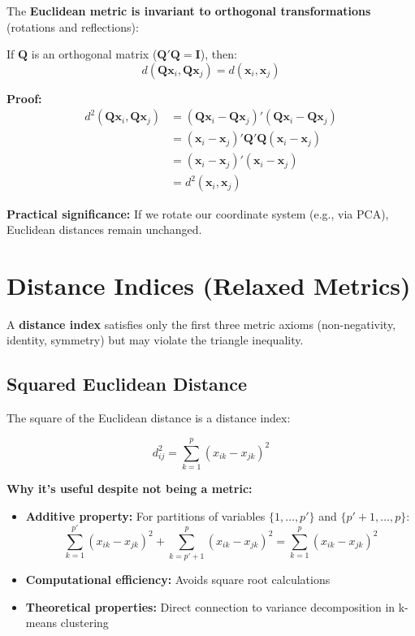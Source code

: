 \documentclass[11pt]{article}
\begin{document}
The \textbf{Euclidean metric is invariant to orthogonal transformations} (rotations and reflections):

If $\mathbf{Q}$ is an orthogonal matrix ($\mathbf{Q}'\mathbf{Q} = \mathbf{I}$), then:
$$d(\mathbf{Q}\mathbf{x}_i, \mathbf{Q}\mathbf{x}_j) = d(\mathbf{x}_i, \mathbf{x}_j)$$

\textbf{Proof:}
\begin{align*}
d^2(\mathbf{Q}\mathbf{x}_i, \mathbf{Q}\mathbf{x}_j) &= (\mathbf{Q}\mathbf{x}_i - \mathbf{Q}\mathbf{x}_j)'(\mathbf{Q}\mathbf{x}_i - \mathbf{Q}\mathbf{x}_j) \\
&= (\mathbf{x}_i - \mathbf{x}_j)'\mathbf{Q}'\mathbf{Q}(\mathbf{x}_i - \mathbf{x}_j) \\
&= (\mathbf{x}_i - \mathbf{x}_j)'(\mathbf{x}_i - \mathbf{x}_j) \\
&= d^2(\mathbf{x}_i, \mathbf{x}_j)
\end{align*}

\textbf{Practical significance:} If we rotate our coordinate system (e.g., via PCA), Euclidean distances remain unchanged.

\section{Distance Indices (Relaxed Metrics)}

A \textbf{distance index} satisfies only the first three metric axioms (non-negativity, identity, symmetry) but may violate the triangle inequality.

\subsection{Squared Euclidean Distance}

The square of the Euclidean distance is a distance index:

$$d_{ij}^2 = \sum_{k=1}^{p} (x_{ik} - x_{jk})^2$$

\textbf{Why it's useful despite not being a metric:}
\begin{itemize}
    \item \textbf{Additive property:} For partitions of variables $\{1, \ldots, p'\}$ and $\{p'+1, \ldots, p\}$:
    $$\sum_{k=1}^{p'} (x_{ik} - x_{jk})^2 + \sum_{k=p'+1}^{p} (x_{ik} - x_{jk})^2 = \sum_{k=1}^{p} (x_{ik} - x_{jk})^2$$
    
    \item \textbf{Computational efficiency:} Avoids square root calculations
    
    \item \textbf{Theoretical properties:} Direct connection to variance decomposition in k-means clustering
\end{itemize}
\end{document}
